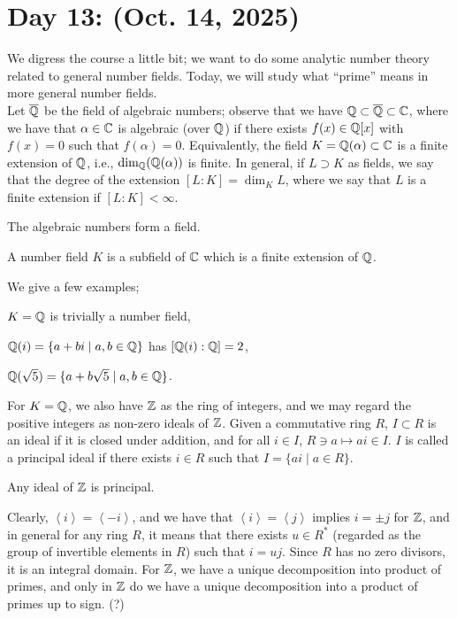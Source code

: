 \section{Day 13: (Oct. 14, 2025)}
We digress the course a little bit; we want to do some analytic number theory related to general number fields. Today, we will study what ``prime'' means in more general number fields.
\\[8pt]
Let $\overline {\mathbb Q}$ be the field of algebraic numbers; observe that we have $\mathbb Q \subset \overline {\mathbb Q} \subset \mathbb C$, where we have that $\alpha \in \mathbb C$ is algebraic (over $\mathbb Q$) if there exists $f(x) \in \mathbb Q[x]$ with $f(x) = 0$ such that $f(\alpha) = 0$. Equivalently, the field $K = \mathbb Q(\alpha) \subset \mathbb C$ is a finite extension of $\mathbb Q$, i.e., $\dim_\mathbb Q (\mathbb Q(\alpha))$ is finite. In general, if $L \supset K$ as fields, we say that the degree of the extension $[L : K] = \dim_K L$, where we say that $L$ is a finite extension if $[L : K] < \infty$.
\begin{fact}
    The algebraic numbers form a field.
\end{fact}
\begin{definition}
    A number field $K$ is a subfield of $\mathbb C$ which is a finite extension of $\mathbb Q$.
\end{definition}
\noindent We give a few examples; \begin{parlist} \item $K = \mathbb Q$ is trivially a number field, \item $\mathbb Q(i) = \{a + bi \mid a, b \in \mathbb Q\}$ has $[\mathbb Q(i) : \mathbb Q] = 2$, \item $\mathbb Q(\sqrt{5})  = \{a + b\sqrt{5} \mid a, b \in \mathbb Q\}$. \end{parlist} For $K = \mathbb Q$, we also have $\mathbb Z$ as the ring of integers, and we may regard the positive integers as non-zero ideals of $\mathbb Z$. Given a commutative ring $R$, $I \subset R$ is an ideal if it is closed under addition, and for all $i \in I$, $R \ni a \mapsto ai \in I$. $I$ is called a principal ideal if there exists $i \in R$ such that $I = \{ai \mid a \in R\}$.
\begin{fact}
    Any ideal of $\mathbb Z$ is principal.
\end{fact}
\noindent Clearly, $\left<i\right> = \left<-i\right>$, and we have that $\left<i\right> = \left<j\right>$ implies $i = \pm j$ for $\mathbb Z$, and in general for any ring $R$, it means that there exists $u \in R^\ast$ (regarded as the group of invertible elements in $R$) such that $i = uj$. Since $R$ has no zero divisors, it is an integral domain. For $\mathbb Z$, we have a unique decomposition into product of primes, and only in $\mathbb Z$ do we have a unique decomposition into a product of primes up to sign. (?)
